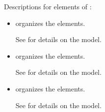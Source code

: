 Descriptions for elements of :

\begin{itemize}

\item {} \newline {} \glspl{organize} the  elements.

See  for details on the  model.

\item {} \newline {} \glspl{organize} the  elements.


See  for details on the  model.

\item {} \newline {} \glspl{organize} the  elements.

See  for details on the  model.
\end{itemize}


